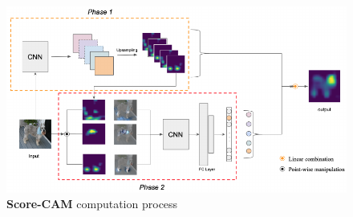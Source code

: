 \begin{figure}[H]
    \centering
    \includegraphics[width=\textwidth]{fig/rel/images/scorecam_schema.pdf}
    \caption{\textbf{Score-CAM} computation process \autocite{wang2020score}}
    \label{fig:rel_sccam}
\end{figure}